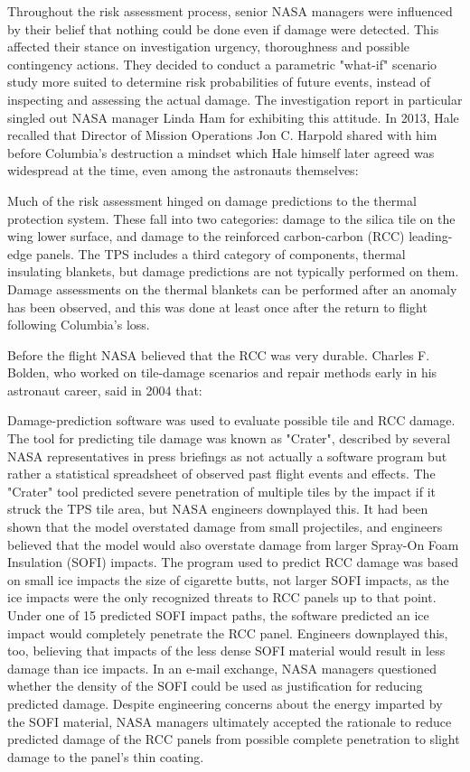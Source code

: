 Throughout the risk assessment process, senior NASA managers were
influenced by their belief that nothing could be done even if damage
were detected. This affected their stance on investigation urgency,
thoroughness and possible contingency actions. They decided to conduct a
parametric "what-if" scenario study more suited to determine risk
probabilities of future events, instead of inspecting and assessing the
actual damage. The investigation report in particular singled out NASA
manager Linda Ham for exhibiting this attitude. In 2013, Hale recalled
that Director of Mission Operations Jon C. Harpold shared with him
before Columbia's destruction a mindset which Hale himself later agreed
was widespread at the time, even among the astronauts themselves:

Much of the risk assessment hinged on damage predictions to the thermal
protection system. These fall into two categories: damage to the silica
tile on the wing lower surface, and damage to the reinforced
carbon-carbon (RCC) leading-edge panels. The TPS includes a third
category of components, thermal insulating blankets, but damage
predictions are not typically performed on them. Damage assessments on
the thermal blankets can be performed after an anomaly has been
observed, and this was done at least once after the return to flight
following Columbia's loss.

Before the flight NASA believed that the RCC was very durable. Charles
F. Bolden, who worked on tile-damage scenarios and repair methods early
in his astronaut career, said in 2004 that:

Damage-prediction software was used to evaluate possible tile and RCC
damage. The tool for predicting tile damage was known as "Crater",
described by several NASA representatives in press briefings as not
actually a software program but rather a statistical spreadsheet of
observed past flight events and effects. The "Crater" tool predicted
severe penetration of multiple tiles by the impact if it struck the TPS
tile area, but NASA engineers downplayed this. It had been shown that
the model overstated damage from small projectiles, and engineers
believed that the model would also overstate damage from larger Spray-On
Foam Insulation (SOFI) impacts. The program used to predict RCC damage
was based on small ice impacts the size of cigarette butts, not larger
SOFI impacts, as the ice impacts were the only recognized threats to RCC
panels up to that point. Under one of 15 predicted SOFI impact paths,
the software predicted an ice impact would completely penetrate the RCC
panel. Engineers downplayed this, too, believing that impacts of the
less dense SOFI material would result in less damage than ice impacts.
In an e-mail exchange, NASA managers questioned whether the density of
the SOFI could be used as justification for reducing predicted damage.
Despite engineering concerns about the energy imparted by the SOFI
material, NASA managers ultimately accepted the rationale to reduce
predicted damage of the RCC panels from possible complete penetration to
slight damage to the panel's thin coating.

